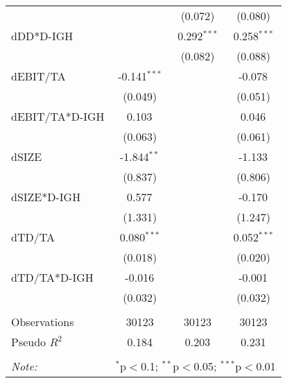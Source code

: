 \begin{table}[!htbp]
\begin{tabular}{@{\extracolsep{5pt}}lccc}
& & (0.072) & (0.080) \\
 dDD*D-IGH & & 0.292$^{***}$ & 0.258$^{***}$ \\
& & (0.082) & (0.088) \\
 dEBIT/TA & -0.141$^{***}$ & & -0.078$^{}$ \\
& (0.049) & & (0.051) \\
 dEBIT/TA*D-IGH & 0.103$^{}$ & & 0.046$^{}$ \\
& (0.063) & & (0.061) \\
 dSIZE & -1.844$^{**}$ & & -1.133$^{}$ \\
& (0.837) & & (0.806) \\
 dSIZE*D-IGH & 0.577$^{}$ & & -0.170$^{}$ \\
& (1.331) & & (1.247) \\
 dTD/TA & 0.080$^{***}$ & & 0.052$^{***}$ \\
& (0.018) & & (0.020) \\
 dTD/TA*D-IGH & -0.016$^{}$ & & -0.001$^{}$ \\
& (0.032) & & (0.032) \\
\hline \\[-1.8ex]
 Observations & 30123 & 30123 & 30123 \\
 Pseudo $R^2$ & 0.184 & 0.203 & 0.231 \\
\hline
\hline \\[-1.8ex]
\textit{Note:} & \multicolumn{3}{r}{$^{*}$p$<$0.1; $^{**}$p$<$0.05; $^{***}$p$<$0.01} \\
\end{tabular}
\end{table}